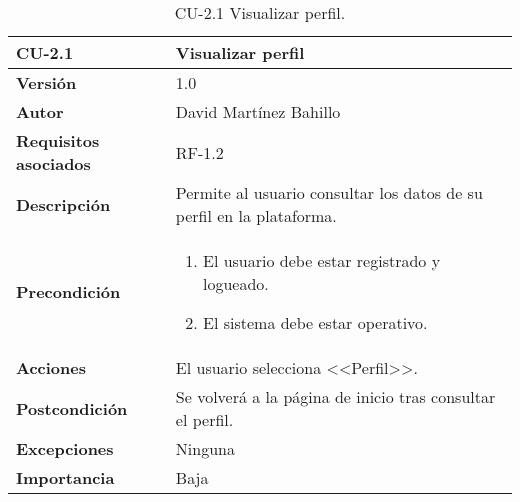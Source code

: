 \begin{table}[p]
	\centering
	\begin{tabularx}{\linewidth}{ p{0.21\columnwidth} p{0.71\columnwidth} }
		\toprule
		\textbf{CU-2.1}    & \textbf{Visualizar perfil}\\
		\midrule
		\textbf{Versión}              & 1.0    \\
		\textbf{Autor}                & David Martínez Bahillo \\
		\textbf{Requisitos asociados} & RF-1.2 \\
		\textbf{Descripción}          & Permite al usuario consultar los datos de su perfil en la plataforma. \\
		\textbf{Precondición}         &  
		\parbox[t]{\linewidth}{
			\begin{enumerate}
				\item El usuario debe estar registrado y logueado.
				\item El sistema debe estar operativo.
			\end{enumerate}
		} \\
		\textbf{Acciones}             & El usuario selecciona <<Perfil>>. \\
		\textbf{Postcondición}        & Se volverá a la página de inicio tras consultar el perfil. \\
		\textbf{Excepciones}          & Ninguna \\
		\textbf{Importancia}          & Baja  \\
		\bottomrule
	\end{tabularx}
	\caption{CU-2.1 Visualizar perfil.}
\end{table}




